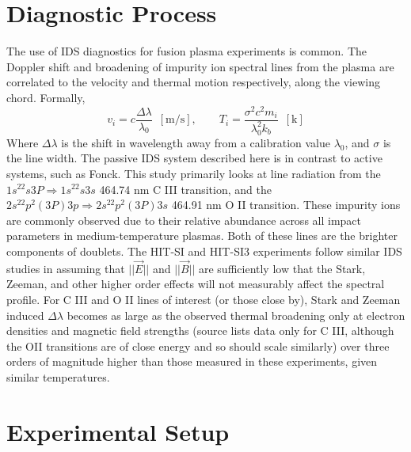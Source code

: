 	\section{Diagnostic Process}
	\hspace{4ex}The use of IDS diagnostics for fusion plasma experiments is common\cite{den1994fast}. The Doppler shift and broadening of impurity ion spectral lines from the plasma are correlated to the velocity and thermal motion respectively, along the viewing chord. Formally, \\
	\begin{equation}\label{Doppler_Eqns}
	v_i = c\frac{\Delta\lambda}{\lambda_0}\,\,\,\mathrm{[m/s]},\qquad
	T_i = \frac{\sigma^2c^2m_i}{\lambda_0^2k_b}\,\,\,\mathrm{[{k}]}
	\end{equation} 
	Where $\Delta\lambda$ is the shift in wavelength away from a calibration value $\lambda_0$, and $\sigma$ is the line width. The passive IDS system described here is in contrast to active systems, such as Fonck\cite{fonck1984determination}. This study primarily looks at line radiation from the $1s^22s3P\Rightarrow1s^22s3s$ 464.74 nm C III transition, and the $2s^22p^2(3P)3p\Rightarrow2s^22p^2(3P)3s$ 464.91 nm O II transition. These impurity ions are commonly observed due to their relative abundance across all impact parameters in medium-temperature plasmas\cite{cothran2006fast}. Both of these lines are the brighter components of doublets. The HIT-SI and HIT-SI3 experiments follow similar IDS studies in assuming that $||\vec{E}||$ and $||\vec{B}||$ are sufficiently low that the Stark, Zeeman, and other higher order effects will not measurably affect the spectral profile. For C III and O II lines of interest (or those close by), Stark and Zeeman induced $\Delta\lambda$ becomes as large as the observed thermal broadening only at electron densities\cite{Konjevic2002} and magnetic field strengths\cite{Carolan1985} (source lists data only for C III, although the OII transitions are of close energy and so should scale similarly) over three orders of magnitude higher than those measured in these experiments, given similar temperatures.
	
	\section{Experimental Setup}
